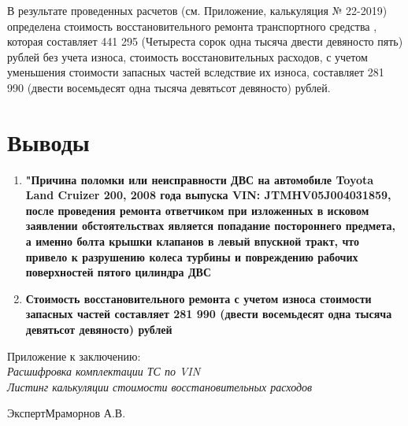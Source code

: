 %
В результате проведенных расчетов (см. Приложение, калькуляция № 22-2019) определена стоимость восстановительного ремонта транспортного средства  , которая составляет 441 295 (Четыреста сорок одна тысяча двести девяносто пять) рублей без учета износа,
стоимость восстановительных расходов, с учетом уменьшения стоимости запасных частей вследствие их износа,  составляет 281 990 (двести восемьдесят одна тысяча девятьсот девяносто) рублей.



\section{Выводы}


\begin{enumerate}
	\item \textbf{"Причина поломки или неисправности ДВС на автомобиле Toyota Land Cruizer 200, 2008 года выпуска VIN: JTMHV05J004031859, после проведения ремонта ответчиком при изложенных в исковом заявлении обстоятельствах является попадание постороннего предмета, а именно болта крышки клапанов в левый впускной тракт, что привело к разрушению колеса турбины и повреждению рабочих поверхностей пятого цилиндра ДВС}
	
	\vspace{5mm}
	
	\item \textbf{ Стоимость восстановительного ремонта с учетом износа стоимости запасных частей составляет 281 990 (двести восемьдесят одна тысяча девятьсот девяносто) рублей}
\end{enumerate}
\vspace{15mm}
\relax
Приложение к заключению:\\
\textit{
	Расшифровка комплектации ТС по VIN \\
	Листинг калькуляции стоимости восстановительных расходов\\
	   }

\vspace{20mm}

{Эксперт}\hfill           {Мраморнов А.В.}

%
%